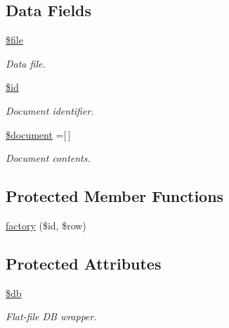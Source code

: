 \subsection*{Data Fields}
\begin{DoxyCompactItemize}
\item 
\hypertarget{class_d_b_1_1_jig_1_1_mapper_aa1bfbd27060176201b271918dff57e8f}{}\label{class_d_b_1_1_jig_1_1_mapper_aa1bfbd27060176201b271918dff57e8f} 
\hyperlink{class_d_b_1_1_jig_1_1_mapper_aa1bfbd27060176201b271918dff57e8f}{\$file}
\begin{DoxyCompactList}\small\item\em Data file. \end{DoxyCompactList}\item 
\hypertarget{class_d_b_1_1_jig_1_1_mapper_ae97941710d863131c700f069b109991e}{}\label{class_d_b_1_1_jig_1_1_mapper_ae97941710d863131c700f069b109991e} 
\hyperlink{class_d_b_1_1_jig_1_1_mapper_ae97941710d863131c700f069b109991e}{\$id}
\begin{DoxyCompactList}\small\item\em Document identifier. \end{DoxyCompactList}\item 
\hypertarget{class_d_b_1_1_jig_1_1_mapper_ac5a31edb787609a3143dec9bfa8063ea}{}\label{class_d_b_1_1_jig_1_1_mapper_ac5a31edb787609a3143dec9bfa8063ea} 
\hyperlink{class_d_b_1_1_jig_1_1_mapper_ac5a31edb787609a3143dec9bfa8063ea}{\$document} =\mbox{[}$\,$\mbox{]}
\begin{DoxyCompactList}\small\item\em Document contents. \end{DoxyCompactList}\end{DoxyCompactItemize}
\subsection*{Protected Member Functions}
\begin{DoxyCompactItemize}
\item 
\hyperlink{class_d_b_1_1_jig_1_1_mapper_a42470c7265ee40e95bb2beed36d8c7c9}{factory} (\$id, \$row)
\end{DoxyCompactItemize}
\subsection*{Protected Attributes}
\begin{DoxyCompactItemize}
\item 
\hypertarget{class_d_b_1_1_jig_1_1_mapper_a1fa3127fc82f96b1436d871ef02be319}{}\label{class_d_b_1_1_jig_1_1_mapper_a1fa3127fc82f96b1436d871ef02be319} 
\hyperlink{class_d_b_1_1_jig_1_1_mapper_a1fa3127fc82f96b1436d871ef02be319}{\$db}
\begin{DoxyCompactList}\small\item\em Flat-\/file DB wrapper. \end{DoxyCompactList}\end{DoxyCompactItemize}



